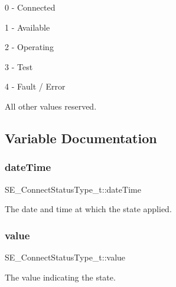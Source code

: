 0 -\/ Connected

1 -\/ Available

2 -\/ Operating

3 -\/ Test

4 -\/ Fault / Error

All other values reserved. 

\subsection{Variable Documentation}
\mbox{\label{group__ConnectStatusType_ga5372706a2bc34efc05ea352a246caf99}} 
\subsubsection{\texorpdfstring{date\+Time}{dateTime}}
{\footnotesize\ttfamily S\+E\+\_\+\+Connect\+Status\+Type\+\_\+t\+::date\+Time}

The date and time at which the state applied. \mbox{\label{group__ConnectStatusType_ga6515f58537159856cbfd403b4bb2919e}} 
\subsubsection{\texorpdfstring{value}{value}}
{\footnotesize\ttfamily S\+E\+\_\+\+Connect\+Status\+Type\+\_\+t\+::value}

The value indicating the state. 